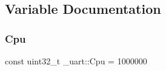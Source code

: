 \subsection{Variable Documentation}
\hypertarget{namespace__uart_adc722494a8735d82dccb72158d1a4165}{}\label{namespace__uart_adc722494a8735d82dccb72158d1a4165} 
\subsubsection{\texorpdfstring{Cpu}{Cpu}}
{\footnotesize\ttfamily const uint32\+\_\+t \+\_\+uart\+::\+Cpu = 1000000}

